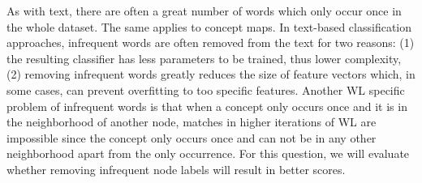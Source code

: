 As with text, there are often a great number of words which only occur once in the whole dataset.
The same applies to concept maps.
In text-based classification approaches, infrequent words are often removed from the text for two reasons: (1) the resulting classifier has less parameters to be trained, thus lower complexity, (2) removing infrequent words greatly reduces the size of feature vectors which, in some cases, can prevent overfitting to too specific features.
Another WL specific problem of infrequent words is that when a concept only occurs once and it is in the neighborhood of another node, matches in higher iterations of WL are impossible since the concept only occurs once and can not be in any other neighborhood apart from the only occurrence.
For this question, we will evaluate whether removing infrequent node labels will result in better scores.